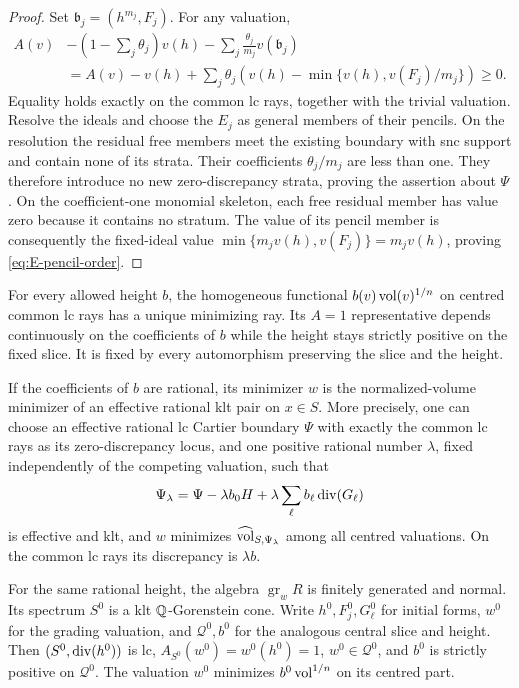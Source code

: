 \begin{proof}
Set $\mathfrak b_j=(h^{m_j},F_j)$. For any valuation,
\begin{align*}
 A(v)&-(1-\sum_j\theta_j)v(h)
               -\sum_j\frac{\theta_j}{m_j}v(\mathfrak b_j)\\
 &=A(v)-v(h)+\sum_j\theta_j
       \left(v(h)-\min\{v(h),v(F_j)/m_j\}\right)\ge0.
\end{align*}
Equality holds exactly on the common lc rays, together with the
trivial valuation. Resolve the ideals and choose the $E_j$ as
general members of their pencils. On the resolution the residual
free members meet the existing boundary with snc support and
contain none of its strata. Their coefficients $\theta_j/m_j$ are
less than one. They therefore introduce no new zero-discrepancy
strata, proving the assertion about $\Psi$.
On the coefficient-one monomial skeleton, each free residual member
has value zero because it contains no stratum. The value of its
pencil member is consequently the fixed-ideal value
$\min\{m_jv(h),v(F_j)\}=m_jv(h)$, proving
\eqref{eq:E-pencil-order}.
\end{proof}

\begin{theorem}\label{thm:E-exact-minimizer}
For every allowed height $b$, the homogeneous functional
$b(v)\operatorname{vol}(v)^{1/n}$ on centred common lc rays has a unique minimizing
ray. Its $A=1$ representative depends continuously on the coefficients
of $b$ while the height stays strictly positive on the fixed slice.
It is fixed by every automorphism preserving the slice and the height.

If the coefficients of $b$ are rational, its minimizer $w$ is the
normalized-volume minimizer of an effective rational klt pair on
$x\in S$. More precisely, one can choose an effective rational lc
Cartier boundary $\Psi$ with exactly the common lc rays as its
zero-discrepancy locus, and one positive rational number $\lambda$,
fixed independently of the competing valuation, such that
\begin{equation}\label{eq:E-klt-perturbation}
 \Psi_\lambda=\Psi-\lambda b_0H
                       +\lambda\sum_\ell b_\ell\operatorname{div}(G_\ell)
\end{equation}
is effective and klt, and $w$ minimizes
$\widehat{\operatorname{vol}}_{S,\Psi_\lambda}$ among all centred valuations.
On the common lc rays its discrepancy is $\lambda b$.

For the same rational height, the algebra $\operatorname{gr}_wR$
is finitely generated and normal.
Its spectrum $S^0$ is a klt $\mathbb Q$-Gorenstein cone.
Write $h^0,F_j^0,G_\ell^0$ for initial forms, $w^0$ for the grading
valuation, and $\mathcal Q^0,b^0$ for the analogous central slice
and height. Then $(S^0,\operatorname{div}(h^0))$ is lc,
$A_{S^0}(w^0)=w^0(h^0)=1$, $w^0\in\mathcal Q^0$, and
$b^0$ is strictly positive on $\mathcal Q^0$.
The valuation $w^0$ minimizes $b^0\operatorname{vol}^{1/n}$ on its centred part.
\end{theorem}

